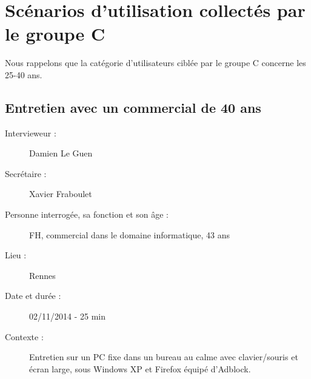 
\newcommand\guy[1]{\og #1\fg}
\newcommand\kel{KelBillet}


\section{Sc\'{e}narios d'utilisation collect\'{e}s par le groupe C}
\label{groupeC:utilisation}
Nous rappelons que la cat\'{e}gorie d'utilisateurs cibl\'{e}e par le groupe C
concerne les 25-40 ans.


\subsection{Entretien avec un commercial de 40 ans}

\begin{description}
\item [Intervieweur :] Damien Le Guen
\item [Secr\'{e}taire :] Xavier Fraboulet
\item [Personne interrog\'{e}e, sa fonction et son \^{a}ge :] FH, commercial dans le domaine informatique, 43 ans
\item [Lieu :] Rennes
\item [Date et dur\'{e}e :] 02/11/2014 - 25 min
\item [Contexte :] Entretien sur un PC fixe dans un bureau au calme avec clavier/souris et \'{e}cran large, sous Windows XP et Firefox \'{e}quip\'{e} d'Adblock.
\end{description}


